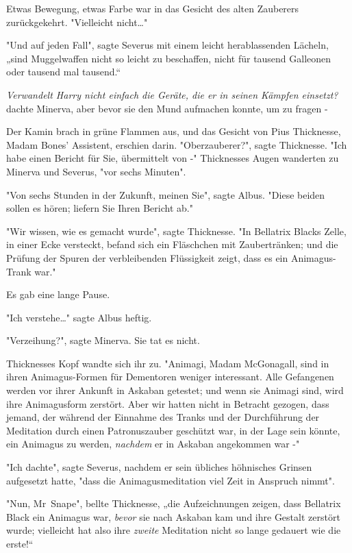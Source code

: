 {Etwas Bewegung, etwas Farbe war in das Gesicht des alten Zauberers zurückgekehrt. "Vielleicht nicht…"

"Und auf jeden Fall", sagte Severus mit einem leicht herablassenden Lächeln, „sind Muggelwaffen nicht so leicht zu beschaffen, nicht für tausend Galleonen oder tausend mal tausend.“

\emph{Verwandelt Harry nicht einfach die Geräte, die er in seinen Kämpfen einsetzt?} dachte Minerva, aber bevor sie den Mund aufmachen konnte, um zu fragen -

Der Kamin brach in grüne Flammen aus, und das Gesicht von Pius Thicknesse, Madam Bones' Assistent, erschien darin. "Oberzauberer?", sagte Thicknesse. "Ich habe einen Bericht für Sie, übermittelt von -" Thicknesses Augen wanderten zu Minerva und Severus, "vor sechs Minuten".

"Von sechs Stunden in der Zukunft, meinen Sie", sagte Albus. "Diese beiden sollen es hören; liefern Sie Ihren Bericht ab."

"Wir wissen, wie es gemacht wurde", sagte Thicknesse. "In Bellatrix Blacks Zelle, in einer Ecke versteckt, befand sich ein Fläschchen mit Zaubertränken; und die Prüfung der Spuren der verbleibenden Flüssigkeit zeigt, dass es ein Animagus-Trank war."

Es gab eine lange Pause.

"Ich verstehe…" sagte Albus heftig.

"Verzeihung?", sagte Minerva. Sie tat es nicht.

Thicknesses Kopf wandte sich ihr zu. "Animagi, Madam McGonagall, sind in ihren Animagus-Formen für Dementoren weniger interessant. Alle Gefangenen werden vor ihrer Ankunft in Askaban getestet; und wenn sie Animagi sind, wird ihre Animagusform zerstört. Aber wir hatten nicht in Betracht gezogen, dass jemand, der während der Einnahme des Tranks und der Durchführung der Meditation durch einen Patronuszauber geschützt war, in der Lage sein könnte, ein Animagus zu werden, \emph{nachdem} er in Askaban angekommen war -"

"Ich dachte", sagte Severus, nachdem er sein übliches höhnisches Grinsen aufgesetzt hatte, "dass die Animagusmeditation viel Zeit in Anspruch nimmt".

"Nun, Mr~Snape", bellte Thicknesse, „die Aufzeichnungen zeigen, dass Bellatrix Black ein Animagus war, \emph{bevor} sie nach Askaban kam und ihre Gestalt zerstört wurde; vielleicht hat also ihre \emph{zweite} Meditation nicht so lange gedauert wie die erste!“

}
